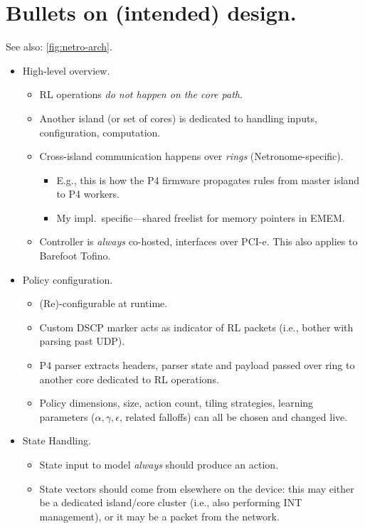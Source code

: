 \documentclass[sigconf,natbib=false]{acmart}
\begin{document}
\section{Bullets on (intended) design.}
See also: \cref{fig:netro-arch}.
\begin{itemize}
	\item High-level overview.
	\begin{itemize}
		\item RL operations \emph{do not happen on the core path}.
		\item Another island (or set of cores) is dedicated to handling inputs, configuration, computation.
		\item Cross-island communication happens over \emph{rings} (Netronome-specific).
		\begin{itemize}
			\item E.g., this is how the P4 firmware propagates rules from master island to P4 workers.
			\item My impl.\ specific---shared freelist for memory pointers in EMEM.
		\end{itemize}
		\item Controller is \emph{always} co-hosted, interfaces over PCI-e. This also applies to Barefoot Tofino.
	\end{itemize}
	\item Policy configuration.
	\begin{itemize}
		\item (Re)-configurable at runtime.
		\item Custom DSCP marker acts as indicator of RL packets (i.e., bother with parsing past UDP).
		\item P4 parser extracts headers, parser state and payload passed over ring to another core dedicated to RL operations.
		\item Policy dimensions, size, action count, tiling strategies, learning parameters ($\alpha, \gamma, \epsilon$, related falloffs) can all be chosen and changed live.
	\end{itemize}
	\item State Handling.
	\begin{itemize}
		\item State input to model \emph{always} should produce an action.
		\item State vectors should come from elsewhere on the device: this may either be a dedicated island/core cluster (i.e., also performing INT management), or it may be a packet from the network.
	\end{itemize}

\end{itemize}
\end{document}
